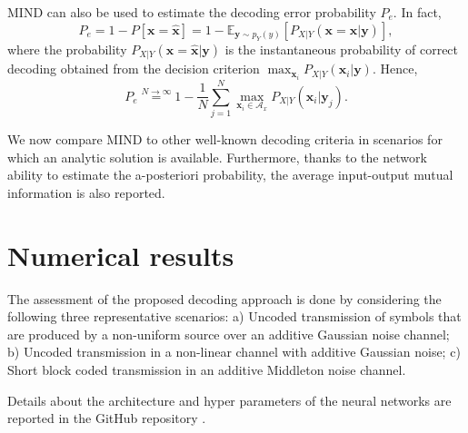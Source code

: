 MIND can also be used to estimate the decoding error probability $P_e$. In fact, 
\begin{equation}
    P_e = 1-P[\mathbf{x}=\hat{\mathbf{x}}] = 1-\mathbb{E}_{\mathbf{y} \sim p_Y(y)}[P_{X|Y}(\mathbf{x}=\mathbf{\hat{x}}|\mathbf{y})],
\end{equation}
where the probability $P_{X|Y}(\mathbf{x}=\mathbf{\hat{x}}|\mathbf{y})$ is the instantaneous probability of correct decoding obtained from the decision criterion $\max_{\mathbf{x}_i} P_{X|Y}(\mathbf{x}_i|\mathbf{y})$. Hence,
\begin{equation}
    P_e \stackrel{N\to \infty}{=} 1-\frac{1}{N} \sum_{j=1}^{N}{\max_{\mathbf{x}_i \in \mathcal{A}_x} P_{X|Y}(\mathbf{x}_i|\mathbf{y}_j)}.
\end{equation}

We now compare MIND to other well-known decoding criteria in scenarios for which an analytic solution is available. Furthermore, thanks to the network ability to estimate the a-posteriori probability, the average input-output mutual information is also reported.

\section{Numerical results}
\label{sec:mind_results}
The assessment of the proposed decoding approach is done by considering the following three representative scenarios: a) Uncoded transmission of symbols that are produced by a non-uniform source over an additive Gaussian noise channel; b) Uncoded transmission in a non-linear channel with additive Gaussian noise; c) Short block coded transmission in an additive Middleton noise channel.

Details about the architecture and hyper parameters of the neural networks are reported in the GitHub repository \cite{MIND_github}.

